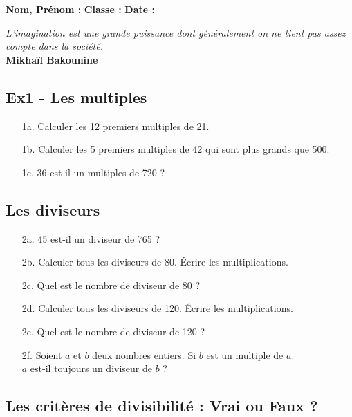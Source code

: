 



\textbf{Nom, Prénom :} \hspace{8cm} \textbf{Classe :} \hspace{3cm} \textbf{Date :}\\

\begin{center}
  \textit{L’imagination est une grande puissance dont généralement on ne tient pas assez compte dans la société.} \\ 
  \textbf{Mikhaïl Bakounine}
\end{center}

\subsection*{Ex1 - Les multiples}

\begin{enumerate}
  \item[1a.] Calculer les 12 premiers multiples de 21.
  \item[1b.] Calculer les 5 premiers multiples de 42 qui sont plus grands que 500.
  \item[1c.] 36 est-il un multiples de 720 ?
\end{enumerate}

\subsection*{Les diviseurs}

\begin{enumerate}
  \item[2a.] 45 est-il un diviseur de 765 ?
  \item[2b.] Calculer tous les diviseurs de 80. Écrire les multiplications. 
  \item[2c.] Quel est le nombre de diviseur de 80 ?
  \item[2d.] Calculer tous les diviseurs de 120. Écrire les multiplications. 
  \item[2e.] Quel est le nombre de diviseur de 120 ?
  \item[2f.] Soient $a$ et $b$ deux nombres entiers. Si $b$ est un multiple de $a$. \\
   $a$ est-il toujours un diviseur de $b$ ?
\end{enumerate}

\subsection*{Les critères de divisibilité : Vrai ou Faux ?}

